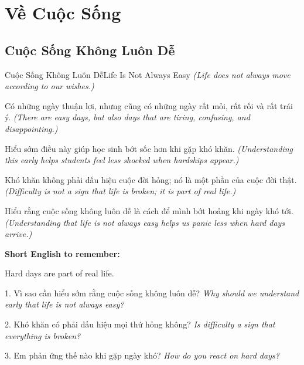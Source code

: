 \chapter{Về Cuộc Sống}

\section{Cuộc Sống Không Luôn Dễ}
\begin{truyen}{Cuộc Sống Không Luôn Dễ}{Life Is Not Always Easy}
\textit{(Life does not always move according to our wishes.)}

Có những ngày thuận lợi, nhưng cũng có những ngày rất mỏi, rất rối và rất trái ý.
\textit{(There are easy days, but also days that are tiring, confusing, and disappointing.)}

Hiểu sớm điều này giúp học sinh bớt sốc hơn khi gặp khó khăn.
\textit{(Understanding this early helps students feel less shocked when hardships appear.)}

Khó khăn không phải dấu hiệu cuộc đời hỏng; nó là một phần của cuộc đời thật.
\textit{(Difficulty is not a sign that life is broken; it is part of real life.)}
\end{truyen}

\begin{baihoc}
Hiểu rằng cuộc sống không luôn dễ là cách để mình bớt hoảng khi ngày khó tới.
\textit{(Understanding that life is not always easy helps us panic less when hard days arrive.)}
\end{baihoc}

\begin{ghinhoanh}
\textbf{Short English to remember:}

Hard days are part of real life.

\end{ghinhoanh}

\begin{tuhocnhanh}
1. Vì sao cần hiểu sớm rằng cuộc sống không luôn dễ? \textit{Why should we understand early that life is not always easy?}

2. Khó khăn có phải dấu hiệu mọi thứ hỏng không? \textit{Is difficulty a sign that everything is broken?}

3. Em phản ứng thế nào khi gặp ngày khó? \textit{How do you react on hard days?}
\end{tuhocnhanh}
\ngancach

